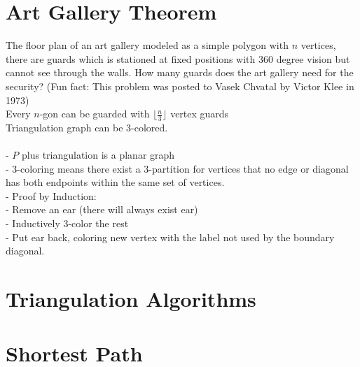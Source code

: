 		\section{Art Gallery Theorem}
			 The floor plan of an art gallery modeled as a simple polygon with $n$ vertices, there are guards which is stationed at fixed positions with 360 degree vision but cannot see through the walls. How many guards does the art gallery need for the security? (Fun fact: This problem was posted to Vasek Chvatal by Victor Klee in 1973)\\
			 Every $n$-gon can be guarded with $\lfloor \frac{n}{3} \rfloor$ vertex guards\\
			 Triangulation graph can be 3-colored.\\
			 \\
			- $P$ plus triangulation is a planar graph\\
			- 3-coloring means there exist a 3-partition for vertices that no edge or diagonal has both endpoints within the same set of vertices.\\
			- Proof by Induction:\\
			\indent - Remove an ear (there will always exist ear) \\
			\indent - Inductively 3-color the rest\\
			\indent - Put ear back, coloring new vertex with the label not used by the boundary diagonal.

		\section{Triangulation Algorithms}

		\section{Shortest Path}


